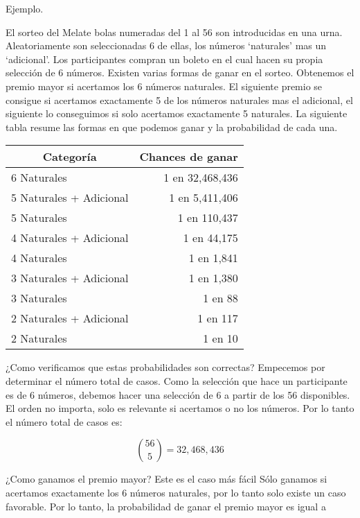 \documentclass[14pt]{extreport}
\theoremstyle{definicion}
\theoremstyle{propiedad}
\begin{document}
\par\noindent
Ejemplo.

El sorteo del Melate bolas numeradas del 1 al 56 son introducidas en una urna. Aleatoriamente son seleccionadas 6 de ellas, los números `naturales' mas un `adicional'. Los participantes compran un boleto en el cual hacen su propia selección de 6 números. Existen varias formas de ganar en el sorteo. Obtenemos el premio mayor si acertamos los 6 números naturales. El siguiente premio se consigue si acertamos exactamente 5 de los números naturales mas el adicional, el siguiente lo conseguimos si solo acertamos exactamente 5 naturales. La siguiente tabla resume las formas en que podemos ganar y la probabilidad de cada una.


\begin{center}
  \begin{tabular}{@{}lr@{}}
    \toprule
    \multicolumn{1}{c}{Categoría} & \multicolumn{1}{c}{Chances de ganar}\\ 
    \midrule
    6 Naturales             & 1 en 32,468,436 \\\midrule
    5 Naturales + Adicional & 1 en 5,411,406  \\\midrule
    5 Naturales             & 1 en 110,437    \\\midrule
    4 Naturales + Adicional & 1 en 44,175     \\\midrule
    4 Naturales             & 1 en 1,841      \\\midrule
    3 Naturales + Adicional & 1 en 1,380      \\\midrule
    3 Naturales             & 1 en 88         \\\midrule
    2 Naturales + Adicional & 1 en 117        \\\midrule
    2 Naturales             & 1 en 10         \\\bottomrule
  \end{tabular}
\end{center}

¿Como verificamos que estas probabilidades son correctas? Empecemos por determinar el número total de casos. Como la selección que hace un participante es de 6 números, debemos hacer una selección de 6 a partir de los 56 disponibles. El orden no importa, solo es relevante si acertamos o no los números. Por lo tanto el número total de casos es: 

$$
\binom{56}{5}= 32,468,436
$$

¿Como ganamos el premio mayor? Este es el caso más fácil Sólo ganamos si acertamos exactamente los 6 números naturales, por lo tanto solo existe un caso favorable. Por lo tanto, la probabilidad de ganar el premio mayor es igual a 
\end{document}
